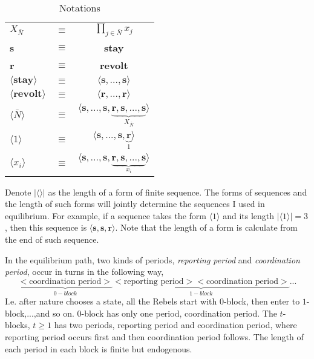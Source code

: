 \documentclass[12pt,letter]{article}
\theoremstyle{definition}
\theoremstyle{remark}
\theoremstyle{claim}
\begin{document}
\begin{table}[t]
\caption{Notations}
\label{Table_msg_form}
\begin{center}
\begin{tabular}{l c c}
$X_{\bar{N}}$ 								& $\equiv$ 			& $\prod_{j\in \bar{N}}x_j$  \\
\textbf{s}										& $\equiv$ 			& \textbf{stay}  \\
\textbf{r}										& $\equiv$ 			& \textbf{revolt}  \\
$\langle \textbf{stay} \rangle$ 		& $\equiv$ 			& $\langle \textbf{s},...,\textbf{s}\rangle$  \\
$\langle \textbf{revolt} \rangle$ 	& $\equiv$ 			& $\langle \textbf{r},...,\textbf{r}\rangle$  \\
$\langle  \bar{N} \rangle$ 				& $\equiv$ 			& $\langle \textbf{s},...,\textbf{s},\underbrace{\textbf{r},\textbf{s},...,\textbf{s}}_{X_{ \bar{N}}}\rangle$  \\

$\langle 1 \rangle$	 					& $\equiv$ 			& $\langle \textbf{s},...,\textbf{s},\underbrace{\textbf{r}}_{1}\rangle$  \\
$\langle x_i \rangle$	 	& $\equiv$ 			& $\langle \textbf{s},...,\textbf{s},\underbrace{\textbf{r},\textbf{s},...,\textbf{s}}_{x_i}\rangle$  \\
\end{tabular}
\end{center}
\end{table}

Denote $|\langle\rangle|$ as the length of a form of finite sequence. The forms of sequences and the length of such forms will jointly determine the sequences I used in equilibrium. For example, if a sequence takes the form $\langle 1 \rangle$ and its length $|\langle 1 \rangle|=3$, then this sequence is $\langle \textbf{s},\textbf{s},\textbf{r}\rangle$. Note that the length of a form is calculate from the end of such sequence.

In the equilibrium path, two kinds of periods, \textit{reporting period} and \textit{coordination period}, occur in turns in the following way,
\[\underbrace{<\text{coordination period}>}_{0-block}\underbrace{<\text{reporting period}><\text{coordination period}>}_{1-block}...\]
I.e. after nature chooses a state, all the Rebels start with $0$-block, then enter to $1$-block,...,and so on. $0$-block has only one period, coordination period. The $t$-blocks, $t\geq 1$ has two periods, reporting period and coordination period, where reporting period occurs first and then coordination period follows. The length of each period in each block is finite but endogenous.
\end{document}
